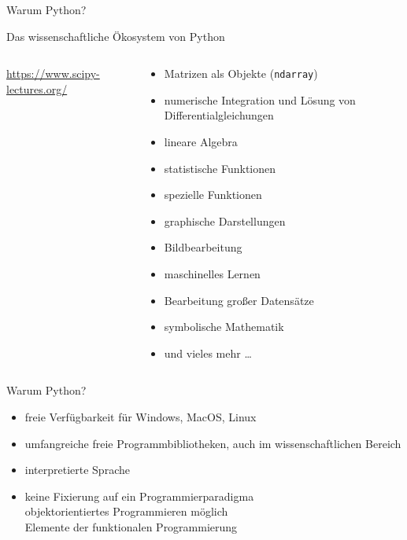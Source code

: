 \documentclass[t, utf8, 10pt]{beamer}
\begin{document}
\begin{frame}{Warum Python?}
\end{frame}

\begin{frame}{Das wissenschaftliche Ökosystem von Python}
 \begin{columns}
  \begin{column}{0.44\textwidth}

   \begin{footnotesize}
    \url{https://www.scipy-lectures.org/}
   \end{footnotesize}
  \end{column}%
  \begin{column}{0.56\textwidth}
   \begin{small}
    \begin{itemize}
     \setlength{\itemindent}{-10pt}
     \item Matrizen als Objekte (\texttt{ndarray})
     \item numerische Integration und Lösung von Differentialgleichungen
     \item lineare Algebra
     \item statistische Funktionen
     \item spezielle Funktionen
     \item graphische Darstellungen
     \item Bildbearbeitung
     \item maschinelles Lernen
     \item Bearbeitung großer Datensätze
     \item symbolische Mathematik
     \item und vieles mehr \ldots
    \end{itemize}
   \end{small}
  \end{column}
 \end{columns}
\end{frame}

\begin{frame}{Warum Python?}
 \begin{itemize}
  \item freie Verfügbarkeit für Windows, MacOS, Linux
  \item umfangreiche freie Programmbibliotheken, auch
        im wissenschaftlichen Bereich
  \item interpretierte Sprache
  \item keine Fixierung auf ein Programmierparadigma\\
        objektorientiertes Programmieren möglich\\
        Elemente der funktionalen Programmierung
 \end{itemize}
\end{frame}
\end{document}
